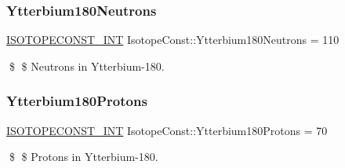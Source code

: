 \subsubsection{\texorpdfstring{Ytterbium180\+Neutrons}{Ytterbium180Neutrons}}
{\footnotesize\ttfamily \mbox{\hyperlink{group___isotope_const-_macros_ga5f18360b3e99483a35c32d789e62621c}{I\+S\+O\+T\+O\+P\+E\+C\+O\+N\+S\+T\+\_\+\+I\+NT}} Isotope\+Const\+::\+Ytterbium180\+Neutrons = 110}

\$ \$ Neutrons in Ytterbium-\/180. \mbox{\label{group___isotope_const-_ytterbium-_yb180_ga454234bf7e83444077a1c955fd737648}} 
\subsubsection{\texorpdfstring{Ytterbium180\+Protons}{Ytterbium180Protons}}
{\footnotesize\ttfamily \mbox{\hyperlink{group___isotope_const-_macros_ga5f18360b3e99483a35c32d789e62621c}{I\+S\+O\+T\+O\+P\+E\+C\+O\+N\+S\+T\+\_\+\+I\+NT}} Isotope\+Const\+::\+Ytterbium180\+Protons = 70}

\$ \$ Protons in Ytterbium-\/180. 